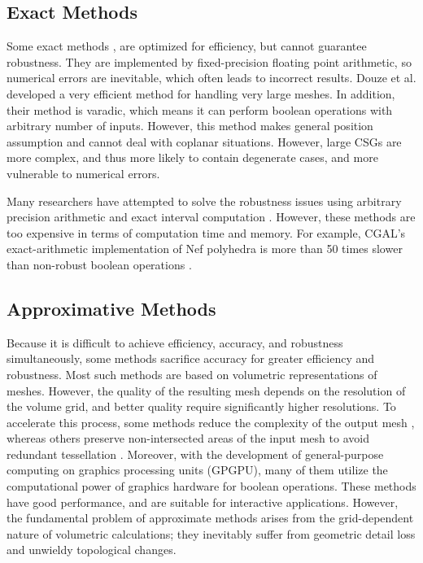 \subsection{Exact Methods}


Some exact methods \cite{ogayar2015deferred,douze2015quickcsg,zhou2016mesh,xu2013fast,feito2013fast}, are optimized for efficiency, but cannot guarantee robustness. They are implemented by fixed-precision floating point arithmetic, so numerical errors are inevitable, which often leads to incorrect results.
Douze et al. \cite{douze2015quickcsg} developed a very efficient method for handling very large meshes. In addition, their method is varadic, which means it can perform boolean operations with arbitrary number of inputs. However, this method makes general position assumption and cannot deal with coplanar situations. However, large CSGs are more complex, and thus more likely to contain degenerate cases, and more vulnerable to numerical errors.


Many researchers have attempted to solve the robustness issues using arbitrary precision arithmetic \cite{banerjee1996topologically, fortune1995polyhedral, keyser2004esolid, granados2003boolean, hachenberger2005boolean} and exact interval computation \cite{fang1993robustness, hu1996robust, segal1990using}. However, these methods are too expensive in terms of computation time and memory. For example, CGAL's \cite{cgal:hk-bonp3-15a} exact-arithmetic implementation \cite{granados2003boolean} of Nef polyhedra \cite{bieri1988elementary} is more than 50 times slower than non-robust boolean operations \cite{bernstein2009fast}.



\subsection{Approximative Methods}


Because it is difficult to achieve efficiency, accuracy, and robustness simultaneously, some methods sacrifice accuracy for greater efficiency and robustness. Most such methods are based on volumetric representations of meshes. However, the quality of the resulting mesh depends on the resolution of the volume grid, and better quality require significantly higher resolutions.
To accelerate this process, some methods reduce the complexity of the output mesh \cite{varadhan2004topology}, whereas others preserve non-intersected areas of the input mesh to avoid redundant tessellation \cite{pavic2010hybrid,wang2011approximate,zhao2011parallel,hable2005blister,ogayar2006gpu}.
Moreover, with the development of general-purpose computing on graphics processing units (GPGPU), many of them utilize the computational power of graphics hardware for boolean operations. These methods have good performance, and are suitable for interactive applications. However, the fundamental problem of approximate methods arises from the grid-dependent nature of volumetric calculations; they inevitably suffer from geometric detail loss and unwieldy topological changes.


